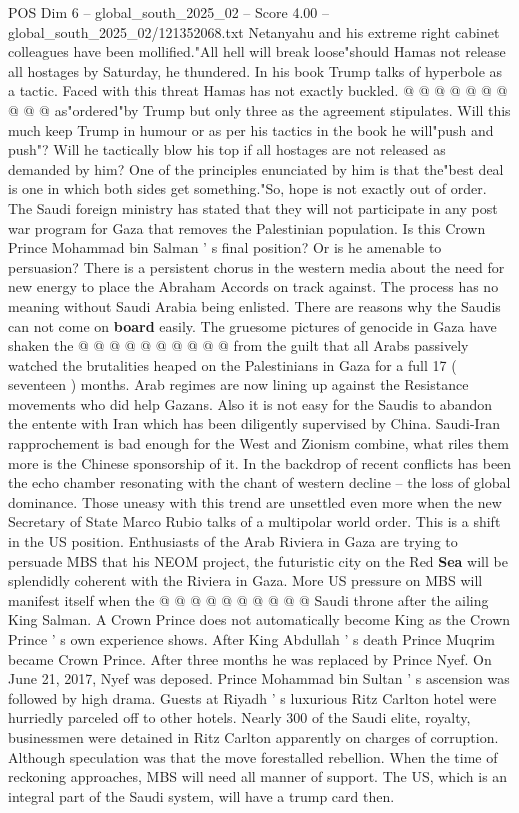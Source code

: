 \begin{textsample}{POS Dim 6 – global\_south\_2025\_02 – Score 4.00 – global\_south\_2025\_02/121352068.txt}
Netanyahu and his extreme right cabinet colleagues have been mollified."All hell will break loose"should Hamas not release all hostages by Saturday, he thundered.
In his book Trump talks of hyperbole as a tactic.
Faced with this threat Hamas has not exactly buckled. @ @ @ @ @ @ @ @ @ @ as"ordered"by Trump but only three as the agreement stipulates.
Will this much keep Trump in humour or as per his tactics in the book he will"push and push"?
Will he tactically blow his top if all hostages are not released as demanded by him?
One of the principles enunciated by him is that the"best deal is one in which both sides get something."So, hope is not exactly out of order.
The Saudi foreign ministry has stated that they will not participate in any post war program for Gaza that removes the Palestinian population.
Is this Crown Prince Mohammad bin Salman ' s final position?
Or is he amenable to persuasion?
There is a persistent chorus in the western media about the need for new energy to place the Abraham Accords on track against.
The process has no meaning without Saudi Arabia being enlisted.
There are reasons why the Saudis can not come on \textbf{board} easily.
The gruesome pictures of genocide in Gaza have shaken the @ @ @ @ @ @ @ @ @ @ from the guilt that all Arabs passively watched the brutalities heaped on the Palestinians in Gaza for a full 17 ( seventeen ) months.
Arab regimes are now lining up against the Resistance movements who did help Gazans.
Also it is not easy for the Saudis to abandon the entente with Iran which has been diligently supervised by China.
Saudi-Iran rapprochement is bad enough for the West and Zionism combine, what riles them more is the Chinese sponsorship of it.
In the backdrop of recent conflicts has been the echo chamber resonating with the chant of western decline -- the loss of global dominance.
Those uneasy with this trend are unsettled even more when the new Secretary of State Marco Rubio talks of a multipolar world order.
This is a shift in the US position.
Enthusiasts of the Arab Riviera in Gaza are trying to persuade MBS that his NEOM project, the futuristic city on the Red \textbf{Sea} will be splendidly coherent with the Riviera in Gaza.
More US pressure on MBS will manifest itself when the @ @ @ @ @ @ @ @ @ @ Saudi throne after the ailing King Salman.
A Crown Prince does not automatically become King as the Crown Prince ' s own experience shows.
After King Abdullah ' s death Prince Muqrim became Crown Prince.
After three months he was replaced by Prince Nyef.
On June 21, 2017, Nyef was deposed.
Prince Mohammad bin Sultan ' s ascension was followed by high drama.
Guests at Riyadh ' s luxurious Ritz Carlton hotel were hurriedly parceled off to other hotels.
Nearly 300 of the Saudi elite, royalty, businessmen were detained in Ritz Carlton apparently on charges of corruption.
Although speculation was that the move forestalled rebellion.
When the time of reckoning approaches, MBS will need all manner of support.
The US, which is an integral part of the Saudi system, will have a trump card then.

\end{textsample}
